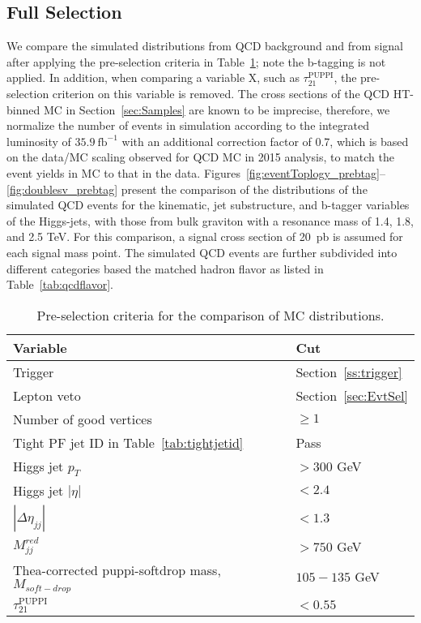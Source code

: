 \subsection{Full Selection}

We compare the simulated distributions from QCD background and from signal after
applying the pre-selection criteria in Table~\ref{tab:datamcselection}; note the
b-tagging is not applied. In addition, when comparing a variable X, such as
$\tau_{21}^\mathrm{PUPPI}$, the pre-selection criterion on this variable is removed.
The cross sections of the QCD HT-binned MC in Section~\ref{sec:Samples} are known
to be imprecise, therefore, we normalize the number of events in simulation
according to the integrated luminosity of $35.9~\mathrm{fb}^{-1}$ with an additional correction
factor of 0.7, which is based on the data/MC scaling observed for QCD MC in 2015
analysis, to match the event yields in MC to that in the data.
Figures~\ref{fig:eventToplogy_prebtag}--\ref{fig:doublesv_prebtag} present the comparison of the
distributions of the simulated QCD events for the kinematic, jet substructure, and b-tagger variables of
the Higgs-jets, with those from bulk graviton with a resonance mass of 1.4, 1.8, and 2.5 TeV. For this comparison, a signal cross section of 20~pb is assumed for each signal mass point. The simulated QCD events are further subdivided into different categories based the matched hadron flavor as listed in Table~\ref{tab:qcdflavor}.


\begin{table}[htb]
\begin{center}
    \begin{tabular}{l l}
    \hline
    \hline
    Variable &  Cut \\
    \hline
    Trigger &  Section~\ref{ss:trigger}\\
    Lepton veto & Section~\ref{sec:EvtSel} \\
    Number of good vertices & $\geq 1$ \\
    Tight PF jet ID in Table~\ref{tab:tightjetid} & Pass  \\
    Higgs jet $p_{T}$ & $>300$ GeV \\
    Higgs jet $\left|\eta\right|$ & $<2.4$ \\
    $|\Delta\eta_{jj}|$ & $<1.3$ \\
    $M_{jj}^{red}$ & $>750$ GeV \\
    Thea-corrected puppi-softdrop mass, $M_{soft-drop}$ & $105-135$ GeV \\
    $\tau_{21}^\mathrm{PUPPI}$ & $<0.55$ \\
    \hline
    \hline
    \end{tabular}
    \caption[Pre-selection criteria for the comparison of MC distributions.]{Pre-selection criteria for the comparison of MC distributions. \label{tab:datamcselection}}
\end{center}
\end{table}

